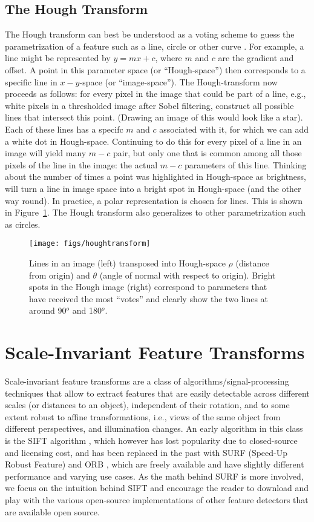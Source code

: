 \subsection{The Hough Transform}
The Hough transform  can best be understood as a voting scheme to guess the parametrization of a feature such as a line, circle or other curve \cite{duda1972use}. For example, a line might be represented by $y=mx+c$, where $m$ and $c$ are the gradient and offset. A point in this parameter space (or ``Hough-space'') then corresponds to a specific line in $x-y$-space (or ``image-space''). The Hough-transform now proceeds as follows: for every pixel in the image that could be part of a line, e.g., white pixels in a thresholded image after Sobel filtering, construct all possible lines that intersect this point. (Drawing an image of this would look like a star). Each of these lines has a specifc $m$ and $c$ associated with it, for which we can add a white dot in Hough-space. Continuing to do this for every pixel of a line in an image will yield many $m-c$ pair, but only one that is common among all those pixels of the line in the image: the actual $m-c$ parameters of this line. Thinking about the number of times a point was highlighted in Hough-space as brightness, will turn a line in image space into a bright spot in Hough-space (and the other way round). In practice, a polar representation is chosen for lines. This is shown in Figure~\ref{fig:hough}. The Hough transform also generalizes to other parametrization such as circles.

\begin{figure}
\center
\texttt{[image: figs/houghtransform]}
\caption{Lines in an image (left) transposed into Hough-space $\rho$ (distance from origin) and $\theta$ (angle of normal with respect to origin). Bright spots in the Hough image (right) correspond to parameters that have received the most ``votes'' and clearly show the two lines at around 90$^o$ and 180$^o$.\label{fig:hough}}
\end{figure}


\section{Scale-Invariant Feature Transforms}
Scale-invariant feature transforms are a class of algorithms/signal-processing techniques that allow to extract features that are easily detectable across different scales (or distances to an object), independent of their rotation, and to some extent robust to affine transformations, i.e., views of the same object from different perspectives, and illumination changes. An early algorithm in this class is the SIFT algorithm \cite{lowe1999object}, which however has lost popularity due to closed-source and licensing cost, and has been replaced in the past with SURF (Speed-Up Robust Feature) \cite{bay2006} and ORB \cite{rublee2011orb},  which are freely available and have slightly different performance and varying use cases. As the math behind SURF is more involved, we focus on the intuition behind SIFT and encourage the reader to download and play with the various open-source implementations of other feature detectors that are available open source.

